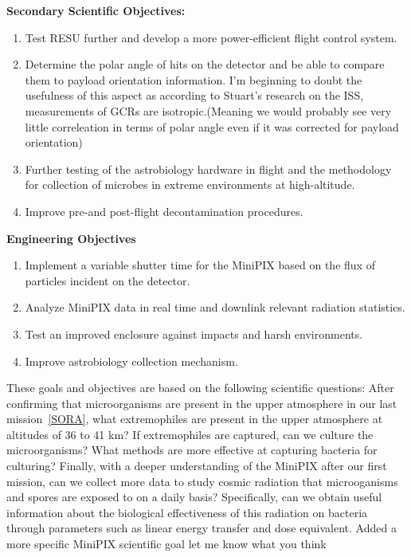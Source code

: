 {\bf Secondary Scientific Objectives:}
	\begin{enumerate}
	\item Test RESU further and develop a more power-efficient flight control system.
	\item Determine the polar angle of hits on the detector and be able to compare them to payload orientation information.
	 {I'm beginning to doubt the usefulness of this aspect as according to Stuart's research on the ISS, measurements of GCRs are isotropic.(Meaning we would probably see very little correleation in terms of polar angle even if it was corrected for payload orientation)}
	\item Further testing of the astrobiology hardware in flight and the methodology for collection of microbes in extreme environments at high-altitude.
	\item Improve pre-and post-flight decontamination procedures.
	\end{enumerate}


{\bf Engineering Objectives}
	\begin{enumerate}
	\item Implement a variable shutter time for the MiniPIX based on the flux of particles incident on the detector.
	\item Analyze MiniPIX data in real time and downlink relevant radiation statistics.
	\item Test an improved enclosure against impacts and harsh environments.
	\item Improve astrobiology collection mechanism.
	\end{enumerate}

These goals and objectives are based on the following scientific questions: After confirming that microorganisms are present in the upper atmosphere in our last mission~\ref{SORA}, what extremophiles are present in the upper atmosphere at altitudes of 36 to 41 km?  If extremophiles are captured, can we culture the microorganisms?  What methods are more effective at capturing bacteria for culturing? Finally, with a deeper understanding of the MiniPIX after our first mission, can we collect more data to study cosmic radiation that microoganisms and spores are exposed to on a daily basis? Specifically, can we obtain useful information about the biological effectiveness of this radiation on bacteria through parameters such as linear energy transfer and dose equivalent. 
 {Added a more specific MiniPIX scientific goal let me know what you think}

